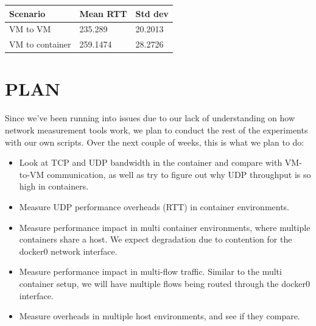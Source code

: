 \documentclass[letterpaper, 10 pt, conference]{ieeeconf}  %
\begin{document}
\begin{tabular}{|p{80pt}|p{55pt}|p{55pt}|}
	\hline
	Scenario & Mean RTT & Std dev \\
    \hline
    VM to VM & 235.289 & 20.2013 \\
    \hline
    VM to container & 259.1474 & 28.2726 \\
	\hline
\end{tabular}

\vspace{5pt}

\section{PLAN}

Since we've been running into issues due to our lack of understanding on how network measurement tools work, we plan to conduct the rest of the experiments with our own scripts. Over the next couple of weeks, this is what we plan to do:

\begin{itemize}
\item Look at TCP and UDP bandwidth in the container and compare with VM-to-VM communication, as well as try to figure out why UDP throughput is so high in containers.
\item Measure UDP performance overheads (RTT) in container environments.
\item Measure performance impact in multi container environments, where multiple containers share a host. We expect degradation due to contention for the docker0 network interface.
\item Measure performance impact in multi-flow traffic. Similar to the multi container setup, we will have multiple flows being routed through the docker0 interface.
\item Measure overheads in multiple host environments, and see if they compare.
\end{itemize}


\addtolength{\textheight}{-12cm}   %











\end{document}
